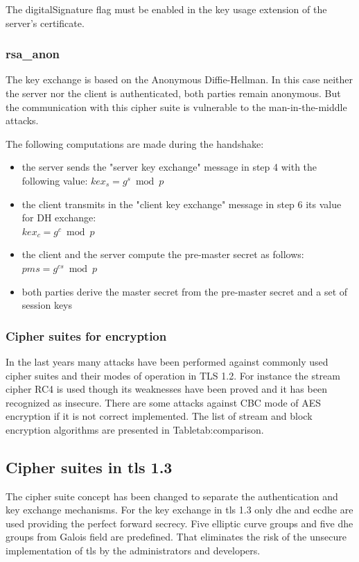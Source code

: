 The digitalSignature flag must be enabled in the key usage extension of the server's certificate.

\subsubsection*{\gls{rsa}\_anon}
The key exchange is based on the Anonymous Diffie-Hellman. In this case neither the server nor the client is authenticated, both parties remain anonymous. But the communication with this cipher suite is vulnerable to the man-in-the-middle attacks.

The following computations are made during the handshake:
\begin{itemize}
	\item the server sends the "server key exchange" message in step 4 with the following value: $\displaystyle kex_s = g^s \bmod p $ 
	\item the client transmits in the "client key exchange" message in step 6 its value for DH exchange: \\ $\displaystyle kex_c = g^c \bmod p $ 
	\item the client and the server compute the pre-master secret as follows: $\displaystyle pms = g^{cs} \bmod p$
	\item both parties derive the master secret from the pre-master secret and a set of session keys
\end{itemize}

\subsubsection*{Cipher suites for encryption}

In the last years many attacks have been performed against commonly used cipher suites and their modes of operation in TLS 1.2. For instance the stream cipher RC4 is used though its weaknesses have been proved and it has been recognized as insecure. There are some attacks against CBC mode of AES encryption if it is not correct implemented.
The list of stream and block encryption algorithms are presented in Table{tab:comparison}.


\subsection{Cipher suites in \gls{tls} 1.3}
\label{subsec:ciphersuits1_3}

The cipher suite concept has been changed to separate the authentication and key exchange mechanisms.
For the key exchange in \gls{tls} 1.3 only \gls{dhe} and \gls{ecdhe} are used providing the perfect forward secrecy. Five elliptic curve groups and five \gls{dhe} groups from Galois field are predefined. That eliminates the risk of the unsecure implementation of \gls{tls} by the administrators and developers.

